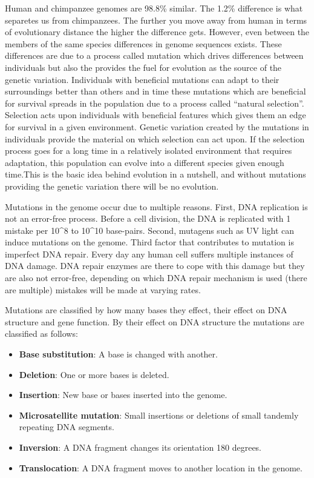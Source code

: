 \documentclass[12pt,]{krantz}
\providecommand{\tightlist}{%
  \setlength{\itemsep}{0pt}\setlength{\parskip}{0pt}}
\begin{document}
Human and chimpanzee genomes are 98.8\% similar. The 1.2\% difference is what separetes
us from chimpanzees. The further you move away from human in terms of evolutionary
distance the higher the difference gets. However, even between the members of
the same species differences in genome sequences exists. These differences are
due to a process called mutation which drives differences between individuals
but also the provides the fuel for evolution as the source of the genetic
variation. Individuals with beneficial mutations can adapt to their surroundings
better than others and in time these mutations which are beneficial for survival
spreads in the population due to a process called ``natural selection''. Selection
acts upon individuals with beneficial features which gives them an edge for
survival in a given environment. Genetic variation created by the mutations
in individuals provide the material on which selection can act upon. If the
selection process goes for a long time in a relatively isolated environment
that requires adaptation, this population can evolve into a different species
given enough time.This is the basic idea behind evolution in a nutshell,
and without mutations providing the genetic variation there will be no evolution.

Mutations in the genome occur due to multiple reasons. First, DNA replication
is not an error-free process. Before a cell division, the DNA is replicated with
1 mistake per 10\^{}8 to 10\^{}10 base-pairs. Second, mutagens such as UV light
can induce mutations on the genome. Third factor that contributes to mutation
is imperfect DNA repair. Every day any human cell suffers multiple instances of DNA damage.
DNA repair enzymes are there to cope with this damage but they are also not
error-free, depending on which DNA repair mechanism is used (there are multiple)
mistakes will be made at varying rates.

Mutations are classified by how many bases they effect, their effect on
DNA structure and gene function. By their effect on DNA structure
the mutations are classified as follows:

\begin{itemize}
\tightlist
\item
  \textbf{Base substitution}: A base is changed with another.
\item
  \textbf{Deletion}: One or more bases is deleted.
\item
  \textbf{Insertion}: New base or bases inserted into the genome.
\item
  \textbf{Microsatellite mutation}: Small insertions or deletions of small tandemly
  repeating DNA segments.
\item
  \textbf{Inversion}: A DNA fragment changes its orientation 180 degrees.
\item
  \textbf{Translocation}: A DNA fragment moves to another location in the genome.
\end{itemize}
\end{document}
